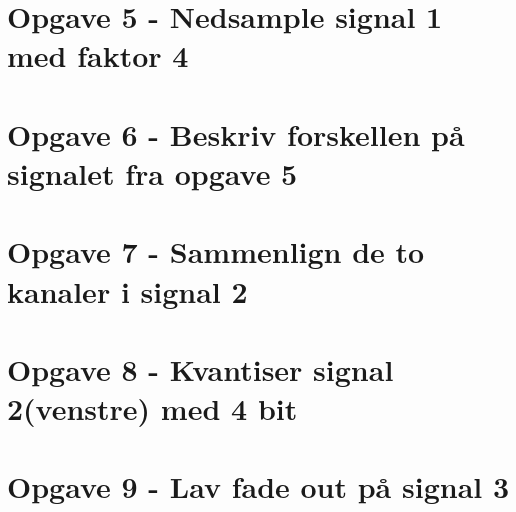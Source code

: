 \documentclass[../main.tex]{subfiles}
\begin{document}
\section{Opgave 5 - Nedsample signal 1 med faktor 4}
\section{Opgave 6 - Beskriv forskellen på signalet fra opgave 5}
\section{Opgave 7 - Sammenlign de to kanaler i signal 2}
\section{Opgave 8 - Kvantiser signal 2(venstre) med 4 bit}
\section{Opgave 9 - Lav fade out på signal 3}
\end{document}
